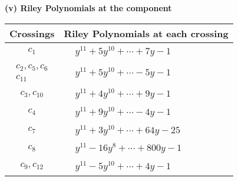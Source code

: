 \documentclass[1p]{elsarticle_modified}
\theoremstyle{definition}
\begin{document}
\newpage\renewcommand{\arraystretch}{1}
\flushleft \textbf{(v) Riley Polynomials at the component}\newline \\
\begin{tabular}{m{50pt}|m{274pt}}
Crossings & \hspace{64pt}Riley Polynomials at each crossing \\
\hline $$\begin{aligned}c_{1}\end{aligned}$$&$\begin{aligned}
&y^{11}+5 y^{10}+\cdots+7 y-1
\end{aligned}$\\
\hline $$\begin{aligned}c_{2},c_{5},c_{6}\\c_{11}\end{aligned}$$&$\begin{aligned}
&y^{11}+5 y^{10}+\cdots-5 y-1
\end{aligned}$\\
\hline $$\begin{aligned}c_{3},c_{10}\end{aligned}$$&$\begin{aligned}
&y^{11}+4 y^{10}+\cdots+9 y-1
\end{aligned}$\\
\hline $$\begin{aligned}c_{4}\end{aligned}$$&$\begin{aligned}
&y^{11}+9 y^{10}+\cdots-4 y-1
\end{aligned}$\\
\hline $$\begin{aligned}c_{7}\end{aligned}$$&$\begin{aligned}
&y^{11}+3 y^{10}+\cdots+64 y-25
\end{aligned}$\\
\hline $$\begin{aligned}c_{8}\end{aligned}$$&$\begin{aligned}
&y^{11}-16 y^8+\cdots+800 y-1
\end{aligned}$\\
\hline $$\begin{aligned}c_{9},c_{12}\end{aligned}$$&$\begin{aligned}
&y^{11}-5 y^{10}+\cdots+4 y-1
\end{aligned}$\\
\hline
\end{tabular}\\~\\
\end{document}
